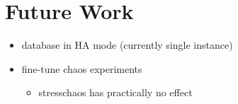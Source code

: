 \chapter{Future Work}

\begin{itemize}
	\item database in HA mode (currently single instance)
	\item fine-tune chaos experiments
	\begin{itemize}
		\item stresschaos has practically no effect
	\end{itemize}
\end{itemize}